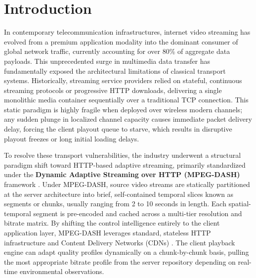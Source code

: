 \documentclass[conference]{IEEEtran}
\begin{document}
\section{Introduction}
In contemporary telecommunication infrastructures, internet video streaming has evolved from a premium application modality into the dominant consumer of global network traffic, currently accounting for over 80\% of aggregate data payloads. This unprecedented surge in multimedia data transfer has fundamentally exposed the architectural limitations of classical transport systems. Historically, streaming service providers relied on stateful, continuous streaming protocols or progressive HTTP downloads, delivering a single monolithic media container sequentially over a traditional TCP connection. This static paradigm is highly fragile when deployed over wireless modern channels; any sudden plunge in localized channel capacity causes immediate packet delivery delay, forcing the client playout queue to starve, which results in disruptive playout freezes or long initial loading delays.

To resolve these transport vulnerabilities, the industry underwent a structural paradigm shift toward HTTP-based adaptive streaming, primarily standardized under the \textbf{Dynamic Adaptive Streaming over HTTP (MPEG-DASH)} framework \cite{iso23009}. Under MPEG-DASH, source video streams are statically partitioned at the server architecture into brief, self-contained temporal slices known as segments or chunks, usually ranging from 2 to 10 seconds in length. Each spatial-temporal segment is pre-encoded and cached across a multi-tier resolution and bitrate matrix. By shifting the control intelligence entirely to the client application layer, MPEG-DASH leverages standard, stateless HTTP infrastructure and Content Delivery Networks (CDNs) \cite{jiang2012}. The client playback engine can adapt quality profiles dynamically on a chunk-by-chunk basis, pulling the most appropriate bitrate profile from the server repository depending on real-time environmental observations.
\end{document}
